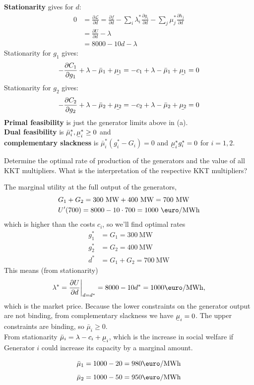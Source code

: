 \documentclass[11pt,a4paper,fleqn]{scrartcl}
\def\l{\lambda}
\def\m{\mu}
\def\d{\partial}
\newcommand{\ubar}[1]{\text{\b{$#1$}}}
\begin{document}
\begin{enumerate}[(a)]
\textbf{ Stationarity} gives for $d$:
 \begin{align*}
   0 & =   \frac{\d \mathcal{L}}{\d d} = \frac{\d f}{\d d} - \sum_{i} \lambda_i^* \frac{\d g_i}{\d d} -  \sum_{j} \mu_j^* \frac{\d h_j}{\d d}\\
   &= \frac{\d U}{\d d} - \l \\
   & = 8000 - 10d - \l 
 \end{align*}
 Stationarity for $g_1$ gives:
 \begin{equation*}
  -\frac{\d C_1}{\d g_1} + \l - \bar{\m}_1 + \ubar{\m_1}  =  -c_1+ \l - \bar{\m}_1 + \ubar{\m_1} = 0
 \end{equation*}
 Stationarity for $g_2$ gives:
 \begin{equation*}
  -\frac{\d C_2}{\d g_2} + \l - \bar{\m}_2 + \ubar{\m_2}  =  -c_2+ \l - \bar{\m}_2 + \ubar{\m_2} = 0
 \end{equation*}
\textbf{ Primal feasibility} is just the generator limits above in (a). \\
 \textbf{Dual feasibility} is $\bar{\m}_i^*,\ubar{\m}_i^* \geq 0$ and \\
  \textbf{complementary slackness} is $\bar{\m}_i^*(g_i^*-G_i) = 0$ and $\ubar{\m}_i^* g_i^* = 0$ for $i=1,2$.
 \begin{shaded}\item Determine the optimal rate of production of the generators and the value of all KKT multipliers. What is the interpretation of the respective KKT multipliers?\end{shaded}
 The marginal utility at the full output of the generators,
 \begin{align*}
 &G_1 + G_2 = 300\ \text{MW} + 400\ \text{MW} = 700\ \text{MW} \\
 &U'(700) = 8000 - 10\cdot700 = 1000\ \text{\euro/MWh}
 \end{align*}  
 which is higher than the costs $c_i$, so we'll find optimal rates
 \begin{align*}
 g_1^* &= G_1 = 300 \ \text{MW} \\
 g_2^* &= G_2 = 400 \ \text{MW} \\
 d^* &= G_1+G_2 = 700\ \text{MW} 
 \end{align*}
This means (from stationarity)
\begin{equation*}
\l^*= \frac{\d U}{\d d} \bigg|_{d=d^*} = 8000 - 10d^* = 1000 \text{\euro/MWh},
\end{equation*} 
which is the market price. Because the lower constraints on the generator output are not binding, from complementary slackness we have $\ubar{\m}_i = 0$. The upper constraints are binding, so $\bar{\m}_i \geq 0$. \\
 From stationarity $\bar{\m}_i =
  \l - c_i + \ubar{\m}_i$, which is the increase in social welfare if Generator $i$
 could increase its capacity by a marginal amount.

 $$\bar{\m}_1=1000-20=980 \text{\euro/MWh}$$
 $$\bar{\m}_2=1000-50=950 \text{\euro/MWh}$$

\end{enumerate}
\newpage
\end{document}
